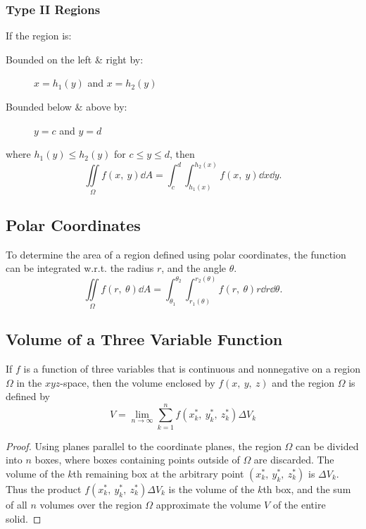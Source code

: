 \documentclass{article}
\begin{document}
\subsubsection{Type II Regions}
If the region is: 
\begin{description}
    \item[Bounded on the left \& right by:] $x=h_1(y)$ and $x=h_2(y)$
    \item[Bounded below \& above by:] $y=c$ and $y=d$
\end{description}
where $h_1(y) \leq h_2(y)$ for $c \leq y \leq d$, then
\begin{equation*}
    \iint\limits_{\Omega} f(x,\: y) \dd{A} = \int_c^d\int_{h_1(x)}^{h_2(x)} f(x,\: y) \dd{x} \dd{y}.
\end{equation*}
\subsection{Polar Coordinates}
To determine the area of a region defined using polar coordinates, 
the function can be integrated w.r.t. the radius $r$, and the angle $\theta$.
\begin{equation*}
    \iint\limits_{\Omega} f(r,\: \theta) \dd{A} = \int_{\theta_1}^{\theta_2}\int_{r_1(\theta)}^{r_2(\theta)} f\left(r,\: \theta\right) r \dd{r} \dd{\theta}.
\end{equation*} 
\subsection{Volume of a Three Variable Function}
\begin{definition}
    If $f$ is a function of three variables that is continuous and nonnegative
    on a region $\Omega$ in the $xyz$-space, then the volume enclosed by $f(x,\: y, \: z)$
    and the region $\Omega$ is defined by
    \begin{equation}\label{eq:volume_of_3d_function}
        V = \lim_{n\to\infty} \sum_{k=1}^{n} f(x_k^\ast,\: y_k^\ast,\: z_k^\ast) \Delta V_k
    \end{equation}
\end{definition}
\begin{proof}
    Using planes parallel to the coordinate planes, the
    region $\Omega$ can be divided into $n$ boxes, where
    boxes containing points outside of $\Omega$ are discarded.
    The volume of the $k$th remaining box at the arbitrary point 
    $(x_k^\ast,\: y_k^\ast,\: z_k^\ast)$ is $\Delta V_k$.
    Thus the product $f(x_k^\ast,\: y_k^\ast,\: z_k^\ast)\Delta V_k$
    is the volume of the $k$th box, and the sum of all $n$ volumes over
    the region $\Omega$ approximate the volume $V$ of the entire solid.
\end{proof}
\end{document}

